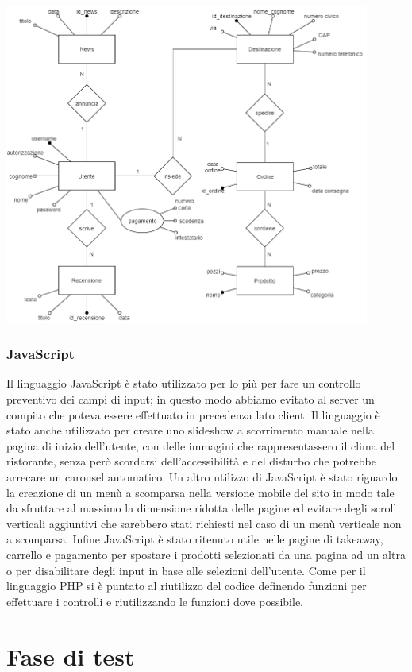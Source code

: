 \documentclass{article}
\begin{document}
			\includegraphics[width=12cm]{DiagrammaER.png}
			
			\subsubsection{JavaScript}
				Il linguaggio JavaScript è stato utilizzato per lo più per fare un controllo preventivo dei campi di input; in questo modo abbiamo evitato al server un compito che poteva essere effettuato in precedenza lato client. Il linguaggio è stato anche utilizzato per creare uno slideshow a scorrimento manuale nella pagina di inizio dell'utente, con delle immagini che rappresentassero il clima del ristorante, senza però scordarsi dell'accessibilità e del disturbo che potrebbe arrecare un carousel automatico. Un altro utilizzo di JavaScript è stato riguardo la creazione di un menù a scomparsa nella versione mobile del sito in modo tale da sfruttare al massimo la dimensione ridotta delle pagine ed evitare degli scroll verticali aggiuntivi che sarebbero stati richiesti nel caso di un menù verticale non a scomparsa. 
				Infine JavaScript è stato ritenuto utile nelle pagine di takeaway, carrello e pagamento per spostare i  prodotti selezionati da una pagina ad un altra o per disabilitare degli input in base alle selezioni dell'utente.
		    	Come per il linguaggio PHP si è puntato al riutilizzo del codice definendo funzioni per effettuare i controlli e riutilizzando le funzioni dove possibile.
	
	\section{Fase di test}
		
\end{document}
